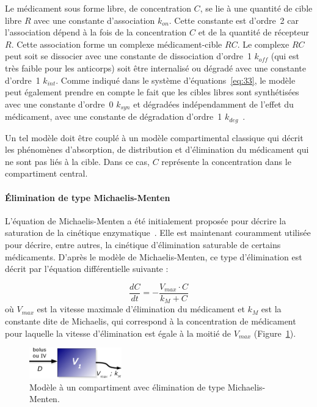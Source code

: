 Le médicament sous forme libre, de concentration $C$, se lie à une quantité de cible libre $R$ avec une constante d'association $k_{on}$. Cette constante est d'ordre~2 car l'association dépend à la fois de la concentration $C$ et de la quantité de récepteur $R$. Cette association forme un complexe médicament-cible $RC$. Le complexe $RC$ peut soit se dissocier avec une constante de dissociation d'ordre~1 $k_{off}$ (qui est très faible pour les anticorps) soit être internalisé ou dégradé avec une constante d'ordre~1 $k_{int}$. Comme indiqué dans le système d'équations~\ref{eq:33}, le modèle peut également prendre en compte le fait que les cibles libres sont synthétisées avec une constante d'ordre~0 $k_{syn}$ et dégradées indépendamment de l'effet du médicament, avec une constante de dégradation d'ordre~1 $k_{deg}$~\citep{REF3}.

Un tel modèle doit être couplé à un modèle compartimental classique qui décrit les phénomènes d'absorption, de distribution et d'élimination du médicament qui ne sont pas liés à la cible. Dans ce cas, $C$ représente la concentration dans le compartiment central.

\paragraph{Élimination de type Michaelis-Menten} L'équation de Michaelis-Menten a été initialement proposée pour décrire la saturation de la cinétique enzymatique~\citep{REF5}. Elle est maintenant couramment utilisée pour décrire, entre autres, la cinétique d'élimination saturable de certains médicaments. D'après le modèle de Michaelis-Menten, ce type d'élimination est décrit par l'équation différentielle suivante :

\begin{equation}
\frac{dC}{dt}=-\frac{V_{max}\cdot C}{k_M + C}
\label{eq:34}
\end{equation}
où $V_{max}$ est la vitesse maximale d'élimination du médicament et $k_M$ est la constante dite de Michaelis, qui correspond à la concentration de médicament pour laquelle la vitesse d'élimination est égale à la moitié de $V_{max}$ (Figure~\ref{fig:7}).

\begin{figure}[htbp]
	\centering
		\includegraphics[width=4cm]{figures/raster/FIG_7}
	\caption{Modèle à un compartiment avec élimination de type Michaelis-Menten.}
	\label{fig:7}
\end{figure}

